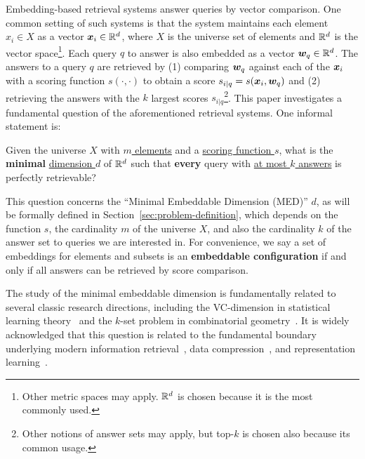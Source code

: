 \documentclass[10pt]{article}
\begin{document}
Embedding-based retrieval systems answer queries by vector comparison. One common setting of such systems is that the system maintains each element $x_i\in X$ as a vector $\bm{x}_i\in \mathbb{R}^d$, where $X$ is the universe set of elements and $\mathbb{R}^d$ is the vector space\footnote{Other metric spaces may apply. $\mathbb{R}^d$ is chosen because it is the most commonly used.}. 
Each query $q$ to answer is also embedded as a vector $\bm{w}_q\in \mathbb{R}^d$. The answers to a query $q$ are retrieved by (1) comparing $\bm{w}_q$ against each of the $\bm{x}_i$ with a scoring function $s(\cdot, \cdot)$ to obtain a score $s_{i|q} = s(\bm{x}_i, \bm{w}_q)$ and (2) retrieving the answers with the $k$ largest scores $s_{i|q}$\footnote{Other notions of answer sets may apply, but top-$k$ is chosen also because its common usage.}.
This paper investigates a fundamental question of the aforementioned retrieval systems. One informal statement is:
\begin{tcolorbox}[colback=yellow!20, colframe=black, sharp corners, boxrule=1pt]
Given the universe $X$ with \underline{$m$ elements} and a \underline{scoring function $s$}, what is the \textbf{minimal} \underline{dimension $d$} of $\mathbb{R}^d$ such that \textbf{every} query with \underline{at most $k$ answers} is perfectly retrievable?
\end{tcolorbox}
This question concerns the ``Minimal Embeddable Dimension (MED)'' $d$, as will be formally defined in Section~\ref{sec:problem-definition}, which depends on the function $s$, the cardinality $m$ of the universe $X$, and also the cardinality $k$ of the answer set to queries we are interested in. For convenience, we say a set of embeddings for elements and subsets is an \textbf{embeddable configuration} if and only if all answers can be retrieved by score comparison.

The study of the minimal embeddable dimension is fundamentally related to several classic research directions, including the VC-dimension in statistical learning theory~\cite{mohri2018foundations} and the $k$-set problem in combinatorial geometry~\cite{matousek2013lectures}. It is widely acknowledged that this question is related to the fundamental boundary underlying modern information retrieval~\cite{lee2019latent,weller2025mfollowir}, data compression~\cite{andoni2008near}, and representation learning~\cite{izacard2021unsupervised,wang2022text}. 
\end{document}

